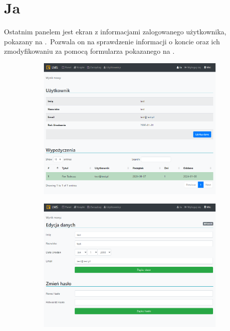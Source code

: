 \begin{figure}[H]
\begin{subfigure}[b]{0.3\textwidth}
        \label{fig:us2}
    \end{subfigure}
    \label{fig:userrrrr}
\end{figure}

\section{Ja}
Ostatnim panelem jest ekran z informacjami zalogowanego użytkownika, pokazany na .\ Pozwala on na sprawdzenie informacji o koncie oraz ich zmodyfikowaniu za pomocą formularza pokazanego na .

\begin{figure}[H]
    \centering
    \begin{subfigure}[b]{0.4\textwidth}
        \includegraphics[width=\textwidth]{images/ja}
        \label{fig:ja}
    \end{subfigure}
    \hfill
    \begin{subfigure}[b]{0.4\textwidth}
        \includegraphics[width=\textwidth]{images/ja1}

\end{subfigure}
\end{figure}
